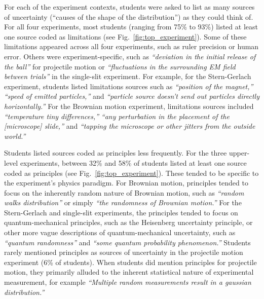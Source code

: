 \documentclass[english,aps,prstper,reprint,showpacs,longbibliography,superscriptaddress,nofootinbib]{revtex4-2}
\begin{document}
For each of the experiment contexts, students were asked to list as many sources of uncertainty (``causes of the shape of the distribution'') as they could think of. %
For all four experiments, most students (ranging from 75\% to 93\%) listed at least one source coded as limitations (see Fig.~\ref{fig:top_experiment}). Some of these limitations appeared across all four experiments, such as ruler precision or human error. Others were experiment-specific, such as \textit{``deviation in the initial release of the ball''} for projectile motion or \textit{``fluctuations in the surrounding EM field between trials''} in the single-slit experiment. For example, for the Stern-Gerlach experiment, students listed limitations sources such as \textit{``position of the magnet,''} \textit{``speed of emitted particles,''} and \textit{``particle source doesn't send out particles directly horizontally.''} For the Brownian motion experiment, limitations sources included \textit{``temperature tiny differences,''} \textit{``any perturbation in the placement of the [microscope] slide,''} and \textit{``tapping the microscope or other jitters from the outside world.''}

Students listed sources coded as principles less frequently. For the three upper-level experiments, between 32\% and 58\% of students listed at least one source coded as principles (see Fig.~\ref{fig:top_experiment}). These tended to be specific to the experiment's physics paradigm. For Brownian motion, principles tended to focus on the inherently random nature of Brownian motion, such as \textit{``random walks distribution''} or simply \textit{``the randomness of Brownian motion.''} For the Stern-Gerlach and single-slit experiments, the principles tended to focus on quantum-mechanical principles, such as the Heisenberg uncertainty principle, or other more vague descriptions of quantum-mechanical uncertainty, such as \textit{``quantum randomness''} and \textit{``some quantum probability phenomenon.''} Students rarely mentioned principles as sources of uncertainty in the projectile motion experiment (6\% of students). When students did mention principles for projectile motion, they primarily alluded to the inherent statistical nature of experimental measurement, for example \textit{``Multiple random measurements result in a gaussian distribution.''}
\end{document}
